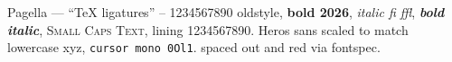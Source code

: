 \documentclass{article}
\begin{document}
Pagella --- ``TeX ligatures'' -- 1234567890 oldstyle, \textbf{bold 2026}, \textit{italic fi ffl},
\textbf{\textit{bold italic}}, \textsc{Small Caps Text}, {\lining lining 1234567890}.
\textsf{Heros sans scaled to match lowercase xyz}, \texttt{cursor mono 0Ol1}.
{spaced out} and {red via fontspec}.
\end{document}
